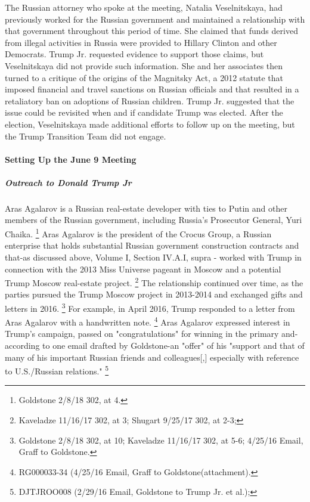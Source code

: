 The Russian attorney who spoke at the meeting, Natalia Veselnitskaya, had previously worked for the Russian government and maintained a relationship with that government throughout this period of time.
She claimed that funds derived from illegal activities in Russia were provided to Hillary Clinton and other Democrats.
Trump Jr. requested evidence to support those claims, but Veselnitskaya did not provide such information.
She and her associates then turned to a critique of the origins of the Magnitsky Act, a 2012 statute that imposed financial and travel sanctions on Russian officials and that resulted in a retaliatory ban on adoptions of Russian children.
Trump Jr. suggested that the issue could be revisited when and if candidate Trump was elected.
After the election, Veselnitskaya made additional efforts to follow up on the meeting, but the Trump Transition Team did not engage.

\paragraph{Setting Up the June 9 Meeting}

\subparagraph{Outreach to Donald Trump Jr}

Aras Agalarov is a Russian real-estate developer with ties to Putin and other members of the Russian government, including Russia's Prosecutor General, Yuri Chaika.%
\footnote{ Goldstone 2/8/18 302, at 4.}
Aras Agalarov is the president of the Crocus Group, a Russian enterprise that holds substantial Russian government construction contracts and that-as discussed above, Volume I, Section IV.A.I, supra - worked with Trump in connection with the 2013 Miss Universe pageant in Moscow and a potential Trump Moscow real-estate project.%
\footnote{ Kaveladze 11/16/17 302, at 3;
Shugart 9/25/17 302, at 2-3;
}
The relationship continued over time, as the parties pursued the Trump Moscow project in 2013-2014 and exchanged gifts and letters in 2016.%
\footnote{ Goldstone 2/8/18 302, at 10;
 Kaveladze 11/16/17 302, at 5-6;
4/25/16 Email, Graff to Goldstone.}
For example, in April 2016, Trump responded to a letter from Aras Agalarov with a handwritten note.%
\footnote{RG000033-34 (4/25/16 Email, Graff to Goldstone(attachment).}
Aras Agalarov expressed interest in Trump's campaign, passed on "congratulations" for winning in the primary and-according to one email drafted by Goldstone-an "offer" of his "support and that of many of his important Russian friends and colleagues[,] especially with reference to U.S./Russian relations."%
\footnote{DJTJROO008 (2/29/16 Email, Goldstone to Trump Jr. et al.);
}

